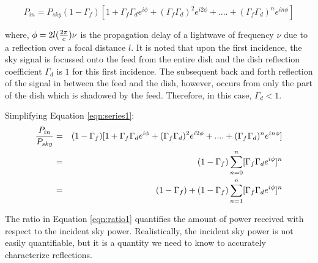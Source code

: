 \documentclass[12pt,preprint]{aastex}
\begin{document}
\begin{equation}\label{eqn:series1}
P_{in} =  P_{sky}(1-\Gamma_{f})[1+ \Gamma_{f}\Gamma_{d} e^{i\phi}+ (\Gamma_{f}\Gamma_{d})^2e^{i2\phi}+ ....+ (\Gamma_{f}\Gamma_{d})^{n}e^{in\phi}]
\end{equation}

where, $\phi = 2l({2\pi \over c})\nu$ is the propagation delay of a lightwave of frequency $\nu$ due to a reflection over a focal distance $l$. It is noted that upon the first incidence, the sky signal is focussed onto the feed from the entire dish and the dish reflection coefficient $\Gamma_{d}$ is $1$ for this first incidence. The subsequent back and forth reflection of the signal in between the feed and the dish, however, occurs from only the part of the dish which is shadowed by the feed. Therefore, in this case, $\Gamma_{d} < 1$.

Simplifying Equation \ref{eqn:series1}:
\begin{eqnarray}\label{eqn:ratio1}
{P_{in} \over P_{sky} } & = & (1-\Gamma_{f})[1+ \Gamma_{f}\Gamma_{d} e^{i\phi}+ (\Gamma_{f}\Gamma_{d})^2e^{i2\phi}+ ....+ (\Gamma_{f}\Gamma_{d})^{n}e^{in\phi}] \nonumber\\
      & = & (1-\Gamma_{f}) \displaystyle\sum\limits_{n=0}^{n} [\Gamma_{f}\Gamma_{d}e^{i \phi}]^{n}\nonumber\\
      & = & (1-\Gamma_{f})+(1-\Gamma_{f}) \displaystyle\sum\limits_{n=1}^{n} [\Gamma_{f}\Gamma_{d}e^{i \phi}]^{n}
\end{eqnarray}

The ratio in Equation \ref{eqn:ratio1} quantifies the amount of power received
with respect to the incident sky power. Realistically, the incident sky power
is not easily quantifiable, but it is a quantity we need to know to accurately
characterize reflections.  


 
\end{document}
